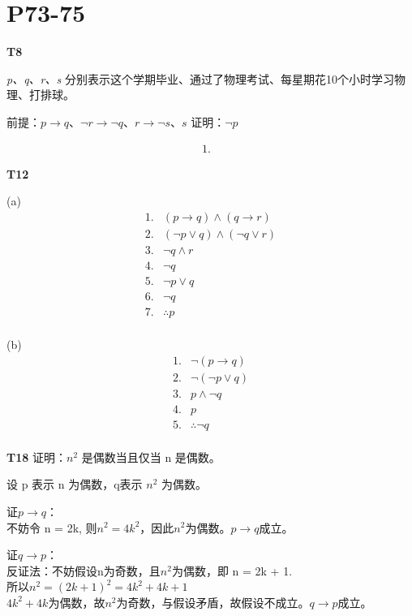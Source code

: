 \documentclass[12pt, a4paper]{ctexart}
\begin{document}
\section{\textbf{P73-75}}

\textbf{T8}

\textit{p、q、r、s} 分别表示这个学期毕业、通过了物理考试、每星期花10个小时学习物理、打排球。

前提：$p \rightarrow q$、$\lnot r \rightarrow \lnot q$、$r \rightarrow \lnot s$、$s$
证明：$\lnot p$

\[
\begin{array}{cc}
    1. & 
\end{array}
\]


\textbf{T12}

(a)
\[
\begin{array}{cc}
    1. & (p \rightarrow q) \land (q \rightarrow r)\\
    2. & (\lnot p \lor q) \land (\lnot q \lor r)\\
    3. & \lnot q \land r\\
    4. & \lnot q\\
    5. & \lnot p \lor q\\
    6. & \lnot q\\
    \hline
    7. & \therefore p\\
\end{array}
\]

(b)
\[
\begin{array}{cc}
    1. & \lnot (p \rightarrow q)\\
    2. & \lnot (\lnot p \lor q)\\
    3. & p \land \lnot q\\
    4. & p\\
    \hline 
    5. & \therefore \lnot q\\
\end{array}
\]

\textbf{T18} 证明：$n^2$ 是偶数当且仅当 n 是偶数。

设 p 表示 n 为偶数，q表示 $n^2$ 为偶数。

证$p \rightarrow q$：\\
不妨令 n = 2k, 则$n^2 = 4k^2$，因此$n^2$为偶数。$p \rightarrow q$成立。

证$q \rightarrow p$：\\
反证法：不妨假设n为奇数，且$n^2$为偶数，即 n = 2k + 1.\\
所以$n^2 = (2k + 1)^2 = 4k^2 + 4k + 1$\\
$4k^2 + 4k$为偶数，故$n^2$为奇数，与假设矛盾，故假设不成立。$q \rightarrow p$成立。
\end{document}
